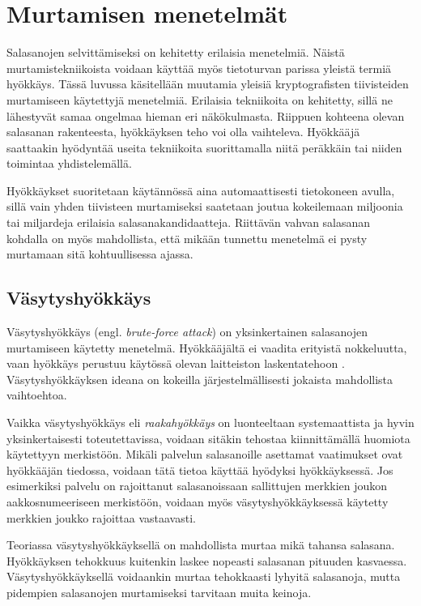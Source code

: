 \chapter{Murtamisen menetelmät\label{ch:menetelmat}}

Salasanojen selvittämiseksi on kehitetty erilaisia menetelmiä. Näistä murtamistekniikoista voidaan käyttää myös tietoturvan parissa yleistä termiä hyökkäys. Tässä luvussa käsitellään muutamia yleisiä kryptografisten tiivisteiden murtamiseen käytettyjä menetelmiä. Erilaisia tekniikoita on kehitetty, sillä ne lähestyvät samaa ongelmaa hieman eri näkökulmasta. Riippuen kohteena olevan salasanan rakenteesta, hyökkäyksen teho voi olla vaihteleva. Hyökkääjä saattaakin hyödyntää useita tekniikoita suorittamalla niitä peräkkäin tai niiden toimintaa yhdistelemällä.

Hyökkäykset suoritetaan käytännössä aina automaattisesti tietokoneen avulla, sillä vain yhden tiivisteen murtamiseksi saatetaan joutua kokeilemaan miljoonia tai miljardeja erilaisia salasanakandidaatteja. Riittävän vahvan salasanan kohdalla on myös mahdollista, että mikään tunnettu menetelmä ei pysty murtamaan sitä kohtuullisessa ajassa.

\section{Väsytyshyökkäys\label{sec:vasytyshyokkays}}

Väsytyshyökkäys (engl. \textit{brute-force attack}) on yksinkertainen salasanojen murtamiseen käytetty menetelmä. Hyökkääjältä ei vaadita erityistä nokkeluutta, vaan hyökkäys perustuu käytössä olevan laitteiston laskentatehoon \citep{bosnjak_brute-force_2018}. Väsytyshyökkäyksen ideana on kokeilla järjestelmällisesti jokaista mahdollista vaihtoehtoa.

Vaikka väsytyshyökkäys eli \textit{raakahyökkäys} on luonteeltaan systemaattista ja hyvin yksinkertaisesti toteutettavissa, voidaan sitäkin tehostaa kiinnittämällä huomiota käytettyyn merkistöön. Mikäli palvelun salasanoille asettamat vaatimukset ovat hyökkääjän tiedossa, voidaan tätä tietoa käyttää hyödyksi hyökkäyksessä. Jos esimerkiksi palvelu on rajoittanut salasanoissaan sallittujen merkkien joukon aakkosnumeeriseen merkistöön, voidaan myös väsytyshyökkäyksessä käytetty merkkien joukko rajoittaa vastaavasti.

Teoriassa väsytyshyökkäyksellä on mahdollista murtaa mikä tahansa salasana. Hyökkäyksen tehokkuus kuitenkin laskee nopeasti salasanan pituuden kasvaessa. Väsytyshyökkäyksellä voidaankin murtaa tehokkaasti lyhyitä salasanoja, mutta pidempien salasanojen murtamiseksi tarvitaan muita keinoja.

